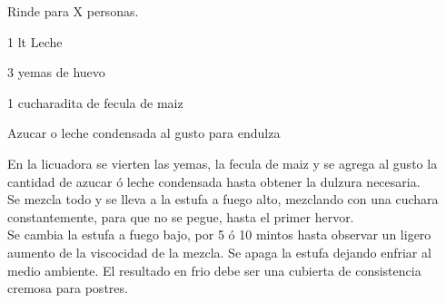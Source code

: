 
Rinde para X personas.

\begin{ingredientes}
\item 1 lt Leche
\item 3 yemas de huevo
\item 1 cucharadita de fecula de maiz
\item Azucar o leche condensada al gusto para endulza
\end{ingredientes}
\preparacion
En la licuadora se vierten las yemas, la fecula de maiz y se agrega al gusto la cantidad de azucar ó leche condensada hasta obtener la dulzura necesaria.\\

Se mezcla todo y se lleva a la estufa a fuego alto, mezclando con una cuchara constantemente, para que no se pegue, hasta el primer hervor.\\

Se cambia la estufa a fuego bajo, por 5 ó 10 mintos hasta observar un ligero aumento de la viscocidad de la mezcla. Se apaga la estufa dejando enfriar al medio ambiente. El resultado en frio debe ser una cubierta de consistencia cremosa para postres.